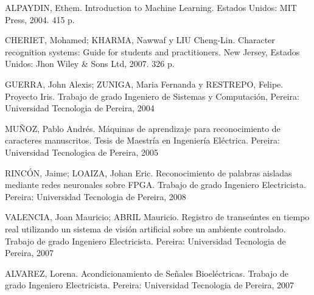 \documentclass[a4paper, 12pt, oneside]{article}
\begin{document}
	ALPAYDIN, Ethem. Introduction to Machine Learning. Estados Unidos: MIT Press, 2004. 415 p.
	
	CHERIET, Mohamed; KHARMA, Nawwaf y LIU Cheng-Lin. Character recognition systems: Guide for students and practitioners. New Jersey, Estados Unidos: Jhon Wiley \& Sons Ltd, 2007. 326 p.
	
	GUERRA, John Alexis; ZUNIGA, Maria Fernanda y RESTREPO, Felipe. Proyecto Iris. Trabajo de grado Ingeniero de Sistemas y Computación, Pereira: Universidad Tecnologia de Pereira, 2004
	
	MUÑOZ, Pablo Andrés. Máquinas de aprendizaje para reconocimiento de caracteres manuscritos. Tesis de Maestría en Ingeniería Eléctrica. Pereira: Universidad Tecnologica de Pereira, 2005
	
	RINCÓN, Jaime; LOAIZA, Johan Eric. Reconocimiento de palabras aisladas mediante redes neuronales sobre FPGA. Trabajo de grado Ingeniero Electricista. Pereira: Universidad Tecnologia de Pereira, 2008
	
	VALENCIA, Joan Mauricio; ABRIL Mauricio. Registro de transeúntes en tiempo real utilizando un sistema de visión artificial sobre un ambiente controlado. Trabajo de grado Ingeniero Electricista. Pereira: Universidad Tecnologia de Pereira, 2007
	
	ALVAREZ, Lorena. Acondicionamiento de Señales Bioeléctricas. Trabajo de grado Ingeniero Electricista. Pereira: Universidad Tecnologia de Pereira, 2007
	
	\clearpage
\end{document}
